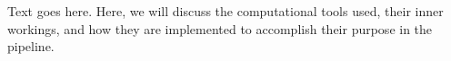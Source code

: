 
%
%
%
%


Text goes here.  Here, we will discuss the computational tools used, their inner workings, and how they are implemented to accomplish their purpose in the pipeline.




